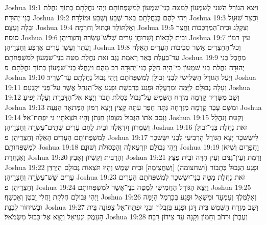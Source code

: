 Joshua 19:1	וַיֵּצֵא הַגּוֹרָל הַשֵּׁנִי לְשִׁמְעוֹן לְמַטֵּה בְנֵי־שִׁמְעוֹן לְמִשְׁפְּחוֹתָם וַיְהִי נַחֲלָתָם בְּתוֹךְ נַחֲלַת בְּנֵי־יְהוּדָה׃
Joshua 19:2	וַיְהִי לָהֶם בְּנַחֲלָתָם בְּאֵר־שֶׁבַע וְשֶׁבַע וּמוֹלָדָה׃
Joshua 19:3	וַחֲצַר שׁוּעָל וּבָלָה וָעָצֶם׃
Joshua 19:4	וְאֶלְתּוֹלַד וּבְתוּל וְחרְמָה׃
Joshua 19:5	וְצִקְלַג וּבֵית־הַמַּרְכָּבוֹת וַחֲצַר סוּסָה׃
Joshua 19:6	וּבֵית לְבָאוֹת וְשָׁרוּחֶן עָרִים שְׁלֹשׁ־עֶשְׂרֵה וְחַצְרֵיהֶן׃
Joshua 19:7	עַיִן  רִמּוֹן וָעֶתֶר וְעָשָׁן עָרִים אַרְבַּע וְחַצְרֵיהֶן׃
Joshua 19:8	וְכל־הַחֲצֵרִים אֲשֶׁר סְבִיבוֹת הֶעָרִים הָאֵלֶּה עַד־בַּעֲלַת בְּאֵר רָאמַת נֶגֶב זֹאת נַחֲלַת מַטֵּה בְנֵי־שִׁמְעוֹן לְמִשְׁפְּחֹתָם׃
Joshua 19:9	מֵחֶבֶל בְּנֵי יְהוּדָה נַחֲלַת בְּנֵי שִׁמְעוֹן כִּי־הָיָה חֵלֶק בְּנֵי־יְהוּדָה רַב מֵהֶם וַיִּנְחֲלוּ בְנֵי־שִׁמְעוֹן בְּתוֹךְ נַחֲלָתָם׃ {פ}
Joshua 19:10	וַיַּעַל הַגּוֹרָל הַשְּׁלִישִׁי לִבְנֵי זְבוּלֻן לְמִשְׁפְּחֹתָם וַיְהִי גְּבוּל נַחֲלָתָם עַד־שָׂרִיד׃
Joshua 19:11	וְעָלָה גְבוּלָם  לַיָּמָּה וּמַרְעֲלָה וּפָגַע בְּדַבָּשֶׁת וּפָגַע אֶל־הַנַּחַל אֲשֶׁר עַל־פְּנֵי יקְנְעָם׃
Joshua 19:12	וְשָׁב מִשָּׂרִיד קֵדְמָה מִזְרַח הַשֶּׁמֶשׁ עַל־גְּבוּל כִּסְלֹת תָּבֹר וְיָצָא אֶל־הַדָּבְרַת וְעָלָה יָפִיעַ׃
Joshua 19:13	וּמִשָּׁם עָבַר קֵדְמָה מִזְרָחָה גִּתָּה חֵפֶר עִתָּה קָצִין וְיָצָא רִמּוֹן הַמְּתֹאָר הַנֵּעָה׃
Joshua 19:14	וְנָסַב אֹתוֹ הַגְּבוּל מִצְּפוֹן חַנָּתֹן וְהָיוּ תֹּצְאֹתָיו גֵּי יִפְתַּח־אֵל׃
Joshua 19:15	וְקַטָּת וְנַהֲלָל וְשִׁמְרוֹן וְיִדְאֲלָה וּבֵית לָחֶם עָרִים שְׁתֵּים־עֶשְׂרֵה וְחַצְרֵיהֶן׃
Joshua 19:16	זֹאת נַחֲלַת בְּנֵי־זְבוּלֻן לְמִשְׁפְּחוֹתָם הֶעָרִים הָאֵלֶּה וְחַצְרֵיהֶן׃ {פ}
Joshua 19:17	לְיִשָּׂשכָר יָצָא הַגּוֹרָל הָרְבִיעִי לִבְנֵי יִשָּׂשכָר לְמִשְׁפְּחוֹתָם׃
Joshua 19:18	וַיְהִי גְּבוּלָם יִזְרְעֶאלָה וְהַכְּסוּלֹת וְשׁוּנֵם׃
Joshua 19:19	וַחֲפָרַיִם וְשִׁיאֹן וַאֲנָחֲרַת׃
Joshua 19:20	וְהָרַבִּית וְקִשְׁיוֹן וָאָבֶץ׃
Joshua 19:21	וְרֶמֶת וְעֵין־גַּנִּים וְעֵין חַדָּה וּבֵית פַּצֵּץ׃
Joshua 19:22	וּפָגַע הַגְּבוּל בְּתָבוֹר (ושחצומה) [וְשַׁחֲצִימָה] וּבֵית שֶׁמֶשׁ וְהָיוּ תֹּצְאוֹת גְּבוּלָם הַיַּרְדֵּן עָרִים שֵׁשׁ־עֶשְׂרֵה וְחַצְרֵיהֶן׃
Joshua 19:23	זֹאת נַחֲלַת מַטֵּה בְנֵי־יִשָּׂשכָר לְמִשְׁפְּחֹתָם הֶעָרִים וְחַצְרֵיהֶן׃ {פ}
Joshua 19:24	וַיֵּצֵא הַגּוֹרָל הַחֲמִישִׁי לְמַטֵּה בְנֵי־אָשֵׁר לְמִשְׁפְּחוֹתָם׃
Joshua 19:25	וַיְהִי גְּבוּלָם חֶלְקַת וַחֲלִי וָבֶטֶן וְאַכְשָׁף׃
Joshua 19:26	וְאַלַמֶּלֶךְ וְעַמְעָד וּמִשְׁאָל וּפָגַע בְּכַרְמֶל הַיָּמָּה וּבְשִׁיחוֹר לִבְנָת׃
Joshua 19:27	וְשָׁב מִזְרַח הַשֶּׁמֶשׁ בֵּית דָּגֹן וּפָגַע בִּזְבֻלוּן וּבְגֵי יִפְתַּח־אֵל צָפוֹנָה בֵּית הָעֵמֶק וּנְעִיאֵל וְיָצָא אֶל־כָּבוּל מִשְּׂמֹאל׃
Joshua 19:28	וְעֶבְרֹן וּרְחֹב וְחַמּוֹן וְקָנָה עַד צִידוֹן רַבָּה׃
